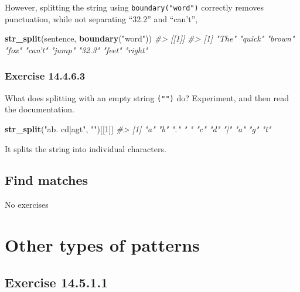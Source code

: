 \documentclass[]{book}
\newenvironment{Shaded}{\begin{snugshade}}{\end{snugshade}}
\newcommand{\CommentTok}[1]{\textcolor[rgb]{0.56,0.35,0.01}{\textit{#1}}}
\newcommand{\DecValTok}[1]{\textcolor[rgb]{0.00,0.00,0.81}{#1}}
\newcommand{\KeywordTok}[1]{\textcolor[rgb]{0.13,0.29,0.53}{\textbf{#1}}}
\newcommand{\NormalTok}[1]{#1}
\newcommand{\StringTok}[1]{\textcolor[rgb]{0.31,0.60,0.02}{#1}}
\theoremstyle{plain}
\theoremstyle{remark}
\begin{document}
However, splitting the string using \texttt{boundary("word")} correctly removes punctuation, while not
separating ``32.2'' and ``can't'',

\begin{Shaded}
\begin{Highlighting}[]
\KeywordTok{str_split}\NormalTok{(sentence, }\KeywordTok{boundary}\NormalTok{(}\StringTok{"word"}\NormalTok{))}
\CommentTok{#> [[1]]}
\CommentTok{#> [1] "The"   "quick" "brown" "fox"   "can’t" "jump"  "32.3"  "feet"  "right"}
\end{Highlighting}
\end{Shaded}

\hypertarget{exercise-14.4.6.3}{%
\subsubsection*{\texorpdfstring{Exercise {14.4.6.3}}{Exercise 14.4.6.3}}\label{exercise-14.4.6.3}}

What does splitting with an empty string \texttt{("")} do? Experiment, and then read the documentation.

\begin{Shaded}
\begin{Highlighting}[]
\KeywordTok{str_split}\NormalTok{(}\StringTok{"ab. cd|agt"}\NormalTok{, }\StringTok{""}\NormalTok{)[[}\DecValTok{1}\NormalTok{]]}
\CommentTok{#>  [1] "a" "b" "." " " "c" "d" "|" "a" "g" "t"}
\end{Highlighting}
\end{Shaded}

It splits the string into individual characters.

\hypertarget{find-matches}{%
\subsection{Find matches}\label{find-matches}}

No exercises

\hypertarget{other-types-of-patterns}{%
\section{Other types of patterns}\label{other-types-of-patterns}}

\hypertarget{exercise-14.5.1.1}{%
\subsection*{\texorpdfstring{Exercise {14.5.1.1}}{Exercise 14.5.1.1}}\label{exercise-14.5.1.1}}
\end{document}
